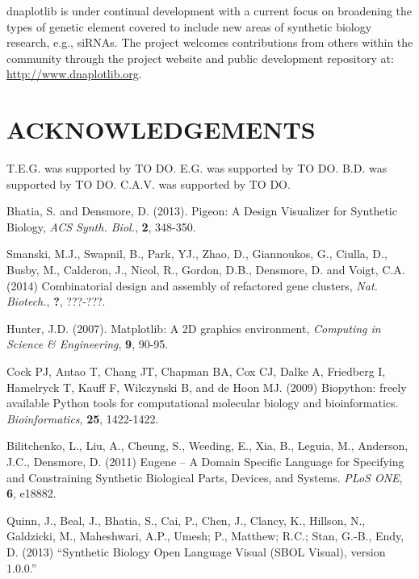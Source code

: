 \documentclass{bioinfo}
\begin{document}

dnaplotlib is under continual development with a current focus on broadening the types of genetic element covered to include new areas of synthetic biology research, e.g., siRNAs. The project welcomes contributions from others within the community through the project website and public development repository at: \href{http://www.dnaplotlib.org}{http://www.dnaplotlib.org}.

\section*{ACKNOWLEDGEMENTS}
T.E.G. was supported by TO DO. E.G. was supported by TO DO. B.D. was supported by TO DO. C.A.V. was supported by TO DO.

\begin{thebibliography}{}
	
 Bhatia, S. and Densmore, D. (2013). Pigeon: A Design Visualizer for Synthetic Biology, {\it ACS Synth. Biol.}, {\bf 2}, 348-350.

 Smanski, M.J., Swapnil, B., Park, YJ., Zhao, D., Giannoukos, G., Ciulla, D., Busby, M., Calderon, J., Nicol, R., Gordon, D.B., Densmore, D. and Voigt, C.A. (2014) Combinatorial design and assembly of refactored gene clusters, {\it Nat. Biotech.}, {\bf ?}, ???-???.

 Hunter, J.D. (2007). Matplotlib: A 2D graphics environment, {\it Computing in Science \& Engineering}, {\bf 9}, 90-95.

Cock PJ, Antao T, Chang JT, Chapman BA, Cox CJ, Dalke A, Friedberg I, Hamelryck T, Kauff F, Wilczynski B, and de Hoon MJ. (2009) Biopython: freely available Python tools for computational molecular biology and bioinformatics. {\it Bioinformatics}, {\bf 25}, 1422-1422.


Bilitchenko, L., Liu, A., Cheung, S., Weeding, E., Xia, B., Leguia, M., Anderson, J.C., Densmore, D. (2011) Eugene – A Domain Specific Language for Specifying and Constraining Synthetic Biological Parts, Devices, and Systems. {\it PLoS ONE}, {\bf 6}, e18882.

Quinn, J., Beal, J., Bhatia, S., Cai, P., Chen, J., Clancy, K., Hillson, N., Galdzicki, M., Maheshwari, A.P., Umesh; P., Matthew; R.C.; Stan, G.-B., Endy, D. (2013) ``Synthetic Biology Open Language Visual (SBOL Visual), version 1.0.0.''


\end{thebibliography}
\end{document}
